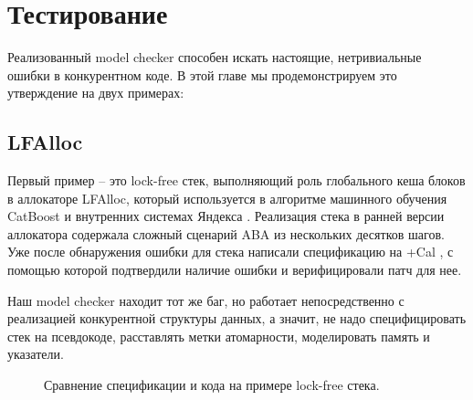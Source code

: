 \chapter{Тестирование}\label{ch:ch3}

Реализованный model checker способен искать настоящие, нетривиальные ошибки в конкурентном коде. В этой главе мы продемонстрируем это утверждение на двух примерах: 

\section{LFAlloc}

Первый пример – это lock-free стек, выполняющий роль глобального кеша блоков в аллокаторе LFAlloc, который используется в алгоритме машинного обучения CatBoost и внутренних системах Яндекса \autocite{YaAlloc}. Реализация стека в ранней версии аллокатора содержала сложный сценарий ABA из нескольких десятков шагов. Уже после обнаружения ошибки для стека написали спецификацию на +Cal \autocite{YaSpec}, с помощью которой подтвердили наличие ошибки и верифицировали патч для нее.

Наш model checker находит тот же баг, но работает непосредственно с реализацией конкурентной структуры данных, а значит, не надо специфицировать стек на псевдокоде, расставлять метки атомарности, моделировать память и указатели.


\begin{figure}
	\bigskip
	\caption{Сравнение спецификации и кода на примере lock-free стека.}
\end{figure}

